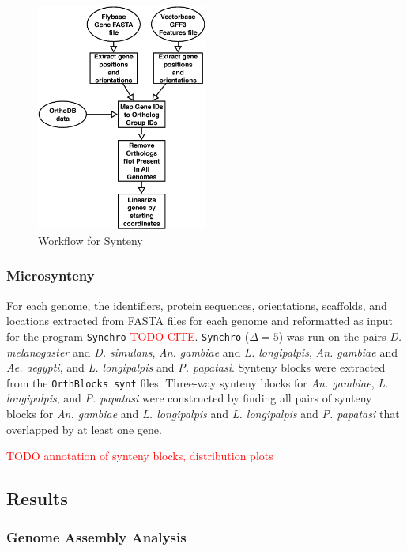 \begin{figure}[H]
  \centering
  \includegraphics[width=0.5\textwidth]{figures/synteny/orthodb_dotplot_workflow}
  \caption{Workflow for Synteny}
  \label{fig:synteny-workflow}
\end{figure}

\subsubsection{Microsynteny} \label{sec:synteny-methods-synchro}
For each genome, the identifiers, protein sequences, orientations, scaffolds, and locations extracted from FASTA files for each genome and reformatted as input for the program \texttt{Synchro} \textcolor{red}{TODO CITE}.  \texttt{Synchro} ($\Delta=5$) was run on the pairs \emph{D. melanogaster} and \emph{D. simulans}, \emph{An. gambiae} and \emph{L. longipalpis}, \emph{An. gambiae} and \emph{Ae. aegypti}, and \emph{L. longipalpis} and \emph{P. papatasi}.  Synteny blocks were extracted from the \texttt{OrthBlocks synt} files.  Three-way synteny blocks for \emph{An. gambiae}, \emph{L. longipalpis}, and \emph{P. papatasi} were constructed by finding all pairs of synteny blocks for \emph{An. gambiae} and \emph{L. longipalpis} and \emph{L. longipalpis} and \emph{P. papatasi} that overlapped by at least one gene.  

\textcolor{red}{TODO annotation of synteny blocks, distribution plots}


\subsection{Results}

\subsubsection{Genome Assembly Analysis}

